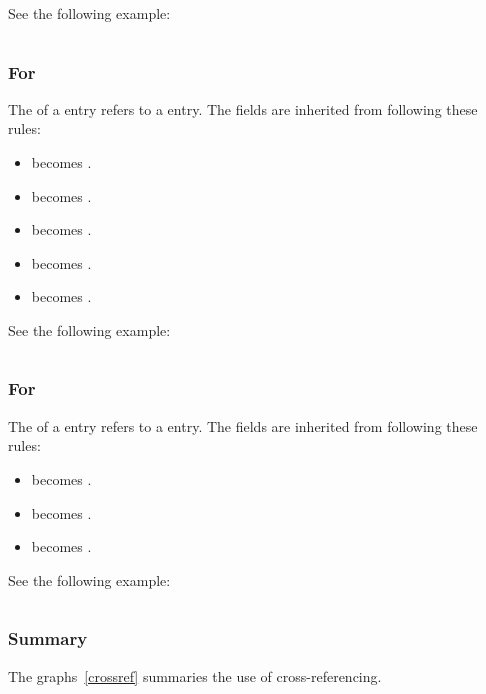 \documentclass{ltxdockit}[2011/03/25]
\begin{document}
See the following example:

\inputminted[breaklines]{latex}{example-bookinarticle.bib}

\subsubsection{For }

The  of a  entry refers to a  entry. The fields are inherited from  following these rules:

\begin{itemize}
	\item {} becomes .
	\item {} becomes .
	\item {} becomes .
	\item {} becomes .
	\item {} becomes .

\end{itemize}

See the following example:

\inputminted[breaklines]{latex}{example-bookinincollection.bib}

\subsubsection{For }
The  of a  entry refers to a  entry. The fields are inherited from  following these rules:

\begin{itemize}
	\item {} becomes .
	\item {} becomes .
	\item {} becomes .

\end{itemize}

See the following example:

\inputminted[breaklines]{latex}{example-bookinthesis.bib}

\subsubsection{Summary}
The graphs~\ref{crossref} summaries the use of cross-referencing.
\end{document}
